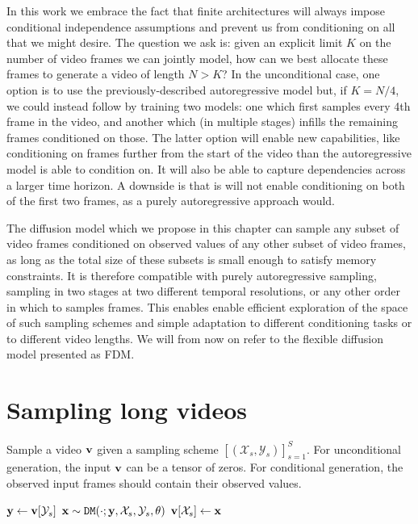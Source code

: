 In this work we embrace the fact that finite architectures will always impose conditional independence assumptions and prevent us from conditioning on all that we might desire. The question we ask is: given an explicit limit $K$ on the number of video frames we can jointly model, how can we best allocate these frames to generate a video of length $N > K$? In the unconditional case, one option is to use the previously-described autoregressive model but, if $K=N/4$, we could instead follow \citet{ho2022video} by training two models: one which first samples every 4th frame in the video, and another which (in multiple stages) infills the remaining frames conditioned on those. The latter option will enable new capabilities, like conditioning on frames further from the start of the video than the autoregressive model is able to condition on. It will also be able to capture dependencies across a larger time horizon. A downside is that is will not enable conditioning on both of the first two frames, as a purely autoregressive approach would.

The diffusion model which we propose in this chapter can sample any subset of video frames conditioned on observed values of any other subset of video frames, as long as the total size of these subsets is small enough to satisfy memory constraints. It is therefore compatible with purely autoregressive sampling, sampling in two stages at two different temporal resolutions, or any other order in which to samples frames. This enables enable efficient exploration of the space of such sampling schemes and simple adaptation to different conditioning tasks or to different video lengths. We will from now on refer to the flexible diffusion model presented as FDM.

\section{Sampling long videos}


\begin{algorithm}[t]
    \centering
    \caption{Sample a video $\rvv$ given a sampling scheme $[(\mathcal{X}_s,\mathcal{Y}_s)]_{s=1}^S$. For unconditional generation, the input $\rvv$ can be a tensor of zeros. For conditional generation, the observed input frames should contain their observed values.}
    \label{alg:sampling}
    \footnotesize
    \begin{algorithmic}[1]
            \State ${\mathbf{y}} \gets {\mathbf{v}} [\mathcal{Y}_s]$ 
            \State ${\mathbf{x}} \sim  \texttt{DM}(\cdot; {\mathbf{y}}, \mathcal{X}_s, \mathcal{Y}_s, \theta)$  
            \State ${\mathbf{v}} [\mathcal{X}_s] \gets {\mathbf{x}}$ 
        \EndFor
    \EndProcedure
    \State \Return {$\rvv$}
    \end{algorithmic}
\end{algorithm}


